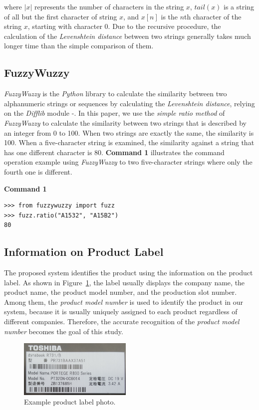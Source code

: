 \documentclass[technicalreport]{ieicej}
\begin{document}
        where $|x|$ represents the number of characters in the string $x$, $tail(x)$ is a string of all but the first character of string $x$, and $x[n]$ is the $n$th character of the string $x$, starting with character 0. Due to the recursive procedure, the calculation of the {\em Levenshtein distance} between two strings generally takes much longer time than the simple comparison of them.

    \subsection{FuzzyWuzzy}
        {\em FuzzyWuzzy} is the {\em Python} library to calculate the similarity between two alphanumeric strings or sequences by calculating the {\em Levenshtein distance}, relying on the {\em Difflib} module \cite{fuzzywuzzy}-\cite{fuzzywuzzy-git}. In this paper, we use the {\em simple ratio method} of {\em FuzzyWuzzy} to calculate the similarity between two strings that is described by an integer from 0 to 100. When two strings are exactly the same, the similarity is 100. When a five-character string is examined, the similarity against a string that has one different character is $80$. {\bf Command 1} illustrates the command operation example using {\em FuzzyWuzzy} to two five-character strings where only the fourth one is different.
     
        \begin{center}\bf Command 1\end{center}
        \begin{lstlisting}
>>> from fuzzywuzzy import fuzz
>>> fuzz.ratio("A1532", "A15B2")
80      \end{lstlisting}

    \subsection{Information on Product Label}
        The proposed system identifies the product using the information on the product label. As shown in Figure~\ref{fig:label-exp}, the label usually displays the company name, the product name, the product model number, and the production slot number. Among them, the {\em product model number} is used to identify the product in our system, because it is usually uniquely assigned to each product regardless of different companies. Therefore, the accurate recognition of the {\em product model number} becomes the goal of this study.

        \begin{figure}[t] 
            \begin{center}
            \includegraphics[width=0.48\textwidth]{figure/label-exp.png}
            \end{center}
            \caption{Example product label photo.}
            \label{fig:label-exp}
        \end{figure}
\end{document}
